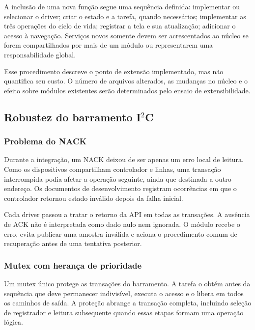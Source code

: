 \documentclass[a4paper,12pt]{article}
\begin{document}
A inclus\~ao de uma nova fun\c{c}\~ao segue uma sequ\^encia definida: implementar ou selecionar o driver; criar o estado e a tarefa, quando necess\'arios; implementar as tr\^es opera\c{c}\~oes do ciclo de vida; registrar a tela e sua atualiza\c{c}\~ao; adicionar o acesso \`a navega\c{c}\~ao. Servi\c{c}os novos somente devem ser acrescentados ao n\'ucleo se forem compartilhados por mais de um m\'odulo ou representarem uma responsabilidade global.


Esse procedimento descreve o ponto de extens\~ao implementado, mas n\~ao quantifica seu custo. O n\'umero de arquivos alterados, as mudan\c{c}as no n\'ucleo e o efeito sobre m\'odulos existentes ser\~ao determinados pelo ensaio de extensibilidade.


\subsection{Robustez do barramento I$^2$C}


\subsubsection{Problema do NACK}


Durante a integra\c{c}\~ao, um NACK deixou de ser apenas um erro local de leitura. Como os dispositivos compartilham controlador e linhas, uma transa\c{c}\~ao interrompida podia afetar a opera\c{c}\~ao seguinte, ainda que destinada a outro endere\c{c}o. Os documentos de desenvolvimento registram ocorr\^encias em que o controlador retornou estado inv\'alido depois da falha inicial.


Cada driver passou a tratar o retorno da API em todas as transa\c{c}\~oes. A aus\^encia de ACK n\~ao \'e interpretada como dado nulo nem ignorada. O m\'odulo recebe o erro, evita publicar uma amostra inv\'alida e aciona o procedimento comum de recupera\c{c}\~ao antes de uma tentativa posterior.


\subsubsection{Mutex com heran\c{c}a de prioridade}


Um mutex \'unico protege as transa\c{c}\~oes do barramento. A tarefa o obt\'em antes da sequ\^encia que deve permanecer indivis\'ivel, executa o acesso e o libera em todos os caminhos de sa\'ida. A prote\c{c}\~ao abrange a transa\c{c}\~ao completa, incluindo sele\c{c}\~ao de registrador e leitura subsequente quando essas etapas formam uma opera\c{c}\~ao l\'ogica.
\end{document}
